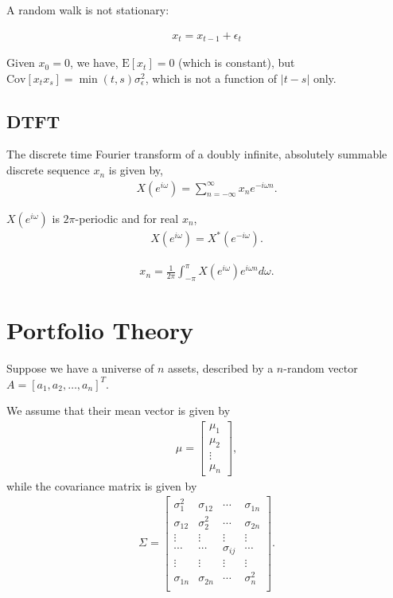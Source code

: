 \documentclass{amsart}
\theoremstyle{plain}
\numberwithin{equation}{section}
\begin{document}
A random walk is not stationary:

\begin{align*}
x_t = x_{t-1} + \epsilon_t
\end{align*}

Given $x_0 = 0$, we have, $\mathrm{E}[x_t] = 0$ (which is constant), but
$\mathrm{Cov}[x_t x_s] = \min(t, s) \sigma_{\epsilon}^2$, which is not 
a function of $|t-s|$ only.
 
\subsection{DTFT}
The discrete time Fourier transform of 
a doubly infinite, absolutely summable discrete sequence $x_n$
is given by,
\begin{align*}
X(e^{i\omega}) = \sum_{n=-\infty}^{\infty} x_n e^{-i \omega n}.
\end{align*}

$X(e^{i\omega})$ is $2\pi$-periodic and for real $x_n$,
\begin{align*}
X(e^{i\omega}) = X^*(e^{-i\omega}).
\end{align*}

\begin{align*}
x_n = \frac{1}{2\pi}
\int_{-\pi}^{\pi} X(e^{i\omega})e^{i\omega n} d \omega.
\end{align*}

\section{Portfolio Theory}
Suppose we have a universe of 
$n$ assets, described by a $n$-random vector 
$A =[a_1, a_2, \ldots, a_n]^T$.

We assume that their mean vector is given by 
\begin{align*}
\mu = 
\begin{bmatrix}
\mu_1\\
\mu_2\\
\vdots\\
\mu_n
\end{bmatrix},
\end{align*}
while the covariance matrix is given by
\begin{align*}
\Sigma = \begin{bmatrix}
\sigma_1^2  & \sigma_{12} & \cdots & \sigma_{1n}\\
\sigma_{12} & \sigma_2^2  & \cdots & \sigma_{2n}\\
\vdots      & \vdots      & \vdots & \vdots \\
\cdots      & \cdots      & \sigma_{ij} & \cdots \\
\vdots      & \vdots      & \vdots & \vdots \\
\sigma_{1n} & \sigma_{2n} & \cdots & \sigma_n^2\\
\end{bmatrix}.
\end{align*}
\end{document}
